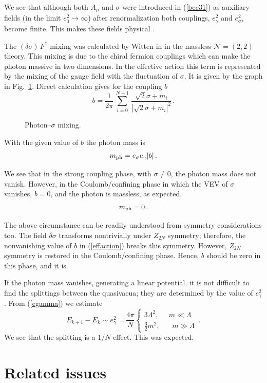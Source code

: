 \documentclass[epsfig,12pt]{article}
\def\beq{\begin{equation}}
\def\eeq{\end{equation}}
\def\beq{\begin{equation}}
\def\eeq{\end{equation}}
\newcommand{\ntwot}{${\mathcal N}= \left(2,2\right) $ }
\begin{document}
{We see that although both $A_{\mu}$ and $\sigma$ were introduced in (\ref{bee31})
as auxiliary fields (in the limit $e^2_0\to\infty$) after renormalization both 
couplings, $e^2_{\gamma}$ and  $e^2_{\sigma}$, become finite. This makes these
fields physical \cite{W79}.

The $(\delta \sigma)\, F^{*}$ mixing was calculated by Witten in \cite{W79}
in the massless \ntwot theory. This mixing  is due to
the chiral fermion couplings which can make the photon massive in two dimensions. In the effective action
this term is represented by the mixing of the gauge field with the fluctuation of 
$\sigma$. It is given by the graph in Fig.~\ref{fig:photsig}. Direct calculation gives
for the coupling $b$ 
\beq
b= \frac{1}{2\pi}\,\sum_{i=0}^{N-1}\,\frac{\sqrt{2}\sigma+m_i}{|\sqrt{2}\sigma+m_i|^2}\,.
\label{gamma}
\eeq
\begin{figure}
\epsfxsize=6cm
\centerline{}
\caption{\small
Photon--$\sigma$ mixing. }
\label{fig:photsig}
\end{figure}
With the given value of $b$ the photon mass is
\beq
m_{\rm ph}=  e_{\sigma}e_{\gamma}|b| \,.
\label{phmass}
\eeq

We see that in the strong coupling phase, with   $\sigma\neq 0$, the photon mass does not vanish.
However, 
 in the Coulomb/confining phase in which the VEV of $\sigma$ vanishes,   $b =0$, 
 and 
the photon is massless, as expected,
\beq
m_{\rm ph}=0\, .
\eeq

The above circumstance can be readily understood from symmetry considerations too.
The field $\delta \sigma$ transforms
nontrivially under $Z_{2N}$ symmetry; therefore, the  nonvanishing value of $b$ in (\ref{effaction})
breaks this symmetry. However, $Z_{2N}$ symmetry is restored in the Coulomb/confining phase.
Hence, $b$ should be zero in this phase, and it is.

If the photon mass vanishes,
generating a linear potential, it is not difficult to find the splittings between 
the quasivacua; they are determined by the value of
$e_{\gamma}^2$. From (\ref{egamma}) we  estimate
\beq
E_{k+1}-E_{k}\sim e^2_{\gamma}
=\frac{4\pi}{N}\left\{
\begin{array}{cc}
3\Lambda^2,\;\;\;\;\; m\ll \Lambda\\[2mm]
\frac32 m^2,\;\;\;\;\;\; m\gg \Lambda
\end{array}\,.
\right.
\label{split}
\eeq
We see that the splitting is a $1/N$ effect. This was expected.

\section{Related issues}
\label{relais}
\setcounter{equation}{0}

}
\end{document}
